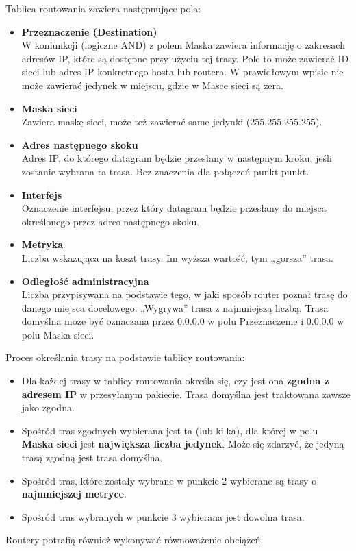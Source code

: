 \documentclass[a4paper]{article}
\begin{document}
Tablica routowania zawiera następnujące pola:
\begin{itemize}
    \item \textbf{Przeznaczenie (Destination)}\\
     W koniunkcji (logiczne AND) z polem Maska zawiera informację o zakresach adresów IP, które są dostępne przy użyciu tej trasy. Pole to może zawierać ID
     sieci lub adres IP konkretnego hosta lub routera. W prawidłowym wpisie nie może zawierać jedynek w miejscu, gdzie w Masce sieci są zera.
    \item \textbf{Maska sieci}\\
     Zawiera maskę sieci, może też zawierać same jedynki (255.255.255.255).
     \item \textbf{Adres następnego skoku}\\
     Adres IP, do którego datagram będzie przesłany w następnym kroku, jeśli zostanie wybrana ta trasa. Bez znaczenia dla połączeń punkt-punkt.
     \item \textbf{Interfejs}\\
     Oznaczenie interfejsu, przez który datagram będzie przesłany do miejsca określonego przez adres następnego skoku.
     \item \textbf{Metryka}\\
     Liczba wskazująca na koszt trasy. Im wyższa wartość, tym „gorsza” trasa.
     \item \textbf{Odległość administracyjna}\\
     Liczba przypisywana na podstawie tego, w jaki sposób router poznał trasę do danego miejsca docelowego. „Wygrywa” trasa z najmniejszą liczbą. Trasa domyślna może być oznaczana przez 0.0.0.0 w polu Przeznaczenie i 0.0.0.0 w polu Maska sieci.
\end{itemize}

Proces określania trasy na podstawie tablicy routowania:
\begin{itemize}
    \item Dla każdej trasy w tablicy routowania określa się, czy jest ona \textbf{zgodna z adresem IP} w przesyłanym pakiecie. Trasa domyślna jest traktowana zawsze jako zgodna.
    \item Spośród tras zgodnych wybierana jest ta (lub kilka), dla której w polu \textbf{Maska sieci} jest \textbf{największa liczba jedynek}. Może się zdarzyć, że jedyną trasą zgodną jest trasa domyślna.
    \item Spośród tras, które zostały wybrane w punkcie 2 wybierane są trasy o \textbf{najmniejszej metryce}.
    \item Spośród tras wybranych w punkcie 3 wybierana jest dowolna trasa.
\end{itemize}
Routery potrafią również wykonywać równoważenie obciążeń.
\end{document}
